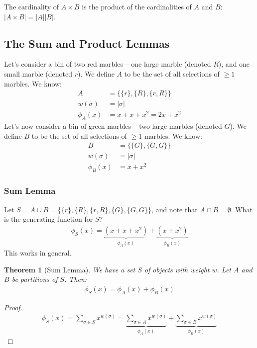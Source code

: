 \documentclass[]{article}
\newtheorem{theorem}{Theorem}[section]
\theoremstyle{definition}
\newcommand{\union}{\cup}
\newcommand{\intersection}{\cap}
\begin{document}
				The cardinality of $A \times B$ is the product of the cardinalities of $A$ and $B$: $|A \times B| = |A||B|$.
		\subsection{The Sum and Product Lemmas}
			Let's consider a bin of two red marbles -- one large marble (denoted $R$), and one small marble (denoted $r$). We define $A$ to be the set of all selections of $\ge 1$ marbles. We know: 
			\begin{align*}
				A &= \{ \{r\}, \{R\}, \{r, R\} \} \\
				w(\sigma) &= |\sigma| \\
				\phi_A(x) &= x + x + x^2 = 2x + x^2
			\end{align*}
			Let's now consider a bin of green marbles -- two large marbles (denoted $G$). We define $B$ to be the set of all selections of $\ge 1$ marbles. We know:
			\begin{align*}
				B &= \{ \{G\}, \{G, G\} \} \\
				w(\sigma) &= |\sigma| \\
				\phi_B(x) &= x + x^2
			\end{align*}
			\subsubsection{Sum Lemma}
				Let $S = A \union B = \{ \{r\}, \{R\}, \{r, R\}, \{G\}, \{G, G\} \}$, and note that $A \intersection B = \emptyset$. What is the generating function for $S$?
				\begin{align*}
					\phi_S(x) = \underbrace{(x + x + x^2)}_{\phi_A(x)} + \underbrace{(x  + x^2)}_{\phi_B(x)}
				\end{align*}
				This works in general.
				
				\begin{theorem}[Sum Lemma]
					We have a set $S$ of objects with weight $w$. Let $A$ and $B$ be partitions of $S$. Then:
					\begin{align*}
						\phi_S(x) = \phi_A(x) + \phi_B(x)
					\end{align*}
				\end{theorem}

				\begin{proof}
					\begin{align*}
						\phi_S(x) = \sum_{\sigma \in S} x^{w(\sigma)} = \underbrace{\sum_{\sigma \in A} x^{w(\sigma)}}_{\phi_A(x)} + \underbrace{\sum_{\sigma \in B} x^{w(\sigma)}}_{\phi_B(x)}
					\end{align*}
				\end{proof}
\end{document}
